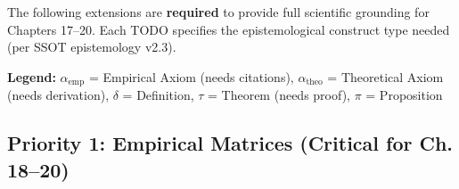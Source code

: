 \begin{tcolorbox}[colback=orange!5!white, colframe=orange!75!black,
    title=\textbf{TODOs: Required Extensions to Support Chapters 17--20}]

The following extensions are \textbf{required} to provide full scientific grounding for Chapters 17--20. Each TODO specifies the epistemological construct type needed (per SSOT epistemology v2.3).

\vspace{1em}
\textbf{Legend:} $\alpha_{\text{emp}}$ = Empirical Axiom (needs citations), $\alpha_{\text{theo}}$ = Theoretical Axiom (needs derivation), $\delta$ = Definition, $\tau$ = Theorem (needs proof), $\pi$ = Proposition

\end{tcolorbox}

\subsection{Priority 1: Empirical Matrices (Critical for Ch. 18--20)}

